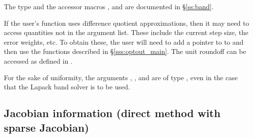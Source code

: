 {  The  type and the accessor macros ,  and
   are documented in \S\ref{ss:band}.


  If the user's  function uses difference quotient
  approximations, then it may need to access quantities not in the
  argument list. These include the current step size, the error
  weights, etc.
  To obtain these, the user will need to add a pointer to  
  to  and then use the  functions described in
  \S\ref{sss:optout_main}. The unit roundoff can be accessed as
   defined in .

  For the sake of uniformity, the arguments , , and  are
  of type , even in the case that the Lapack band solver is to be used.
}

\subsection{Jacobian information (direct method with sparse Jacobian)}
\label{ss:sjacFn}


